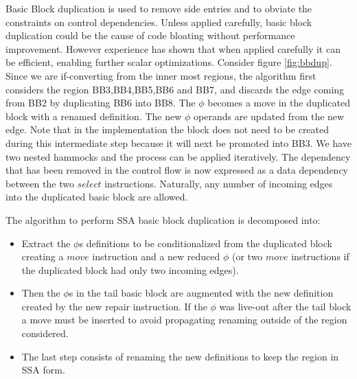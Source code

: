 Basic Block duplication is used to remove side entries and to obviate the constraints on control dependencies. Unless applied carefully, basic block duplication could be the cause of code bloating without performance improvement. However experience has shown that when applied carefully it can be efficient, enabling further scalar optimizations.
Consider figure \ref{fig:bbdup}. Since we are if-converting from the inner most regions, the algorithm first considers the region {BB3,BB4,BB5,BB6 and BB7}, and discards the edge coming from BB2 by duplicating BB6 into BB8. The $\phi$ becomes a move in the duplicated block with a renamed definition. The new $\phi$ operands are updated from the new edge. Note that in the implementation the block does not need to be created during this intermediate step because it will next be promoted into BB3. We have two nested hammocks and the process can be applied iteratively. The dependency that has been removed in the control flow is now expressed as a data dependency between the two $select$ instructions.
Naturally, any number of incoming edges into the duplicated basic block are allowed.

The algorithm to perform SSA basic block duplication is decomposed into:
\begin{itemize}
\item Extract the $\phi$s definitions to be conditionalized from the duplicated block creating a $move$ instruction and a new reduced $\phi$ (or two $move$ instructions if the duplicated block had only two incoming edges).
\item Then the $\phi$s in the tail basic block are augmented with the new definition created by the new repair instruction. If the $\phi$ was live-out after the tail block a move must be inserted to avoid propagating renaming outside of the region considered. 
\item The last step consists of renaming the new definitions to keep the region in SSA form.
\end{itemize}

